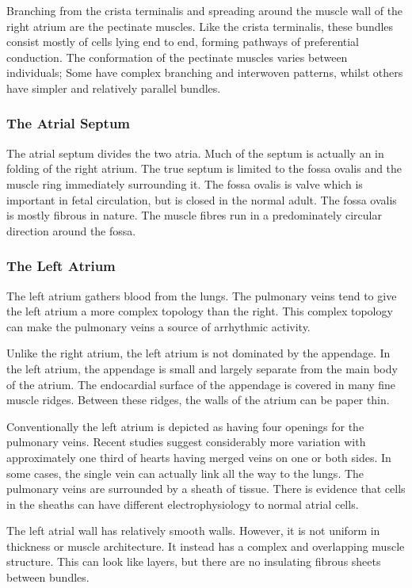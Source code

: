 Branching from the crista terminalis and spreading around the muscle wall of the
right atrium are the pectinate muscles.
Like the crista terminalis, these bundles consist mostly of cells lying end to
end, forming pathways of preferential conduction.
The conformation of the pectinate muscles varies between individuals; Some have
complex branching and interwoven patterns, whilst others have simpler and
relatively parallel bundles.

\subsubsection{The Atrial Septum}

The atrial septum divides the two atria.
Much of the septum is actually an in folding of the right atrium.
The true septum is limited to the fossa ovalis and the muscle ring immediately
surrounding it.
The fossa ovalis is valve which is important in fetal circulation, but is
closed in the normal adult.
The fossa ovalis is mostly fibrous in nature.
The muscle fibres run in a predominately circular direction around the fossa.

\subsubsection{The Left Atrium}

The left atrium gathers blood from the lungs.
The pulmonary veins tend to give the left atrium a more complex topology than
the right.
This complex topology can make the pulmonary veins a source of arrhythmic
activity.

Unlike the right atrium, the left atrium is not dominated by the appendage.
In the left atrium, the appendage is small and largely separate from the main
body of the atrium.
The endocardial surface of the appendage is covered in many fine muscle ridges.
Between these ridges, the walls of the atrium can be paper thin.

Conventionally the left atrium is depicted as having four openings for the
pulmonary veins.
Recent studies suggest considerably more variation with approximately one third
of hearts having merged veins on one or both sides.
In some cases, the single vein can actually link all the way to the lungs.
The pulmonary veins are surrounded by a sheath of tissue.
There is evidence that cells in the sheaths can have different electrophysiology
to normal atrial cells.

The left atrial wall has relatively smooth walls.
However, it is not uniform in thickness or muscle architecture.
It instead has a complex and overlapping muscle structure.
This can look like layers, but there are no insulating fibrous sheets between
bundles.

